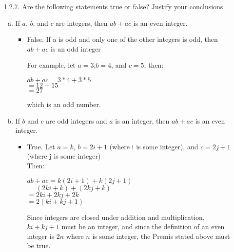 \documentclass[12pt]{article}
\begin{document}
\begin{itemize}
\hrulefill

\item[1.2.7.] Are the following statements true or false? Justify your conclusions.
\begin{enumerate}[(a)]
\item If $a$, $b$, and $c$ are integers, then $ab+ac$ is an even integer.
\begin{itemize}
    \item False. If a is odd and only one of the other integers is odd, then $ab+ac$ is an odd integer
\par For example, let $a=3$,$b=4$, and $c=5$, then:
\begin{center}
    $ab+ac=3*4+3*5$ \\
    $=12+15$ \\
    $=27$
\end{center}
which is an odd number.
\end{itemize}
\item If $b$ and $c$ are odd integers and $a$ is an integer, then $ab+ac$ is an even integer.
\begin{itemize}
    \item True. Let $a=k$, $b=2i+1$ (where i is some integer), and $c=2j+1$ (where j is some integer) \\
    Then:
    \begin{center}
        $ab+ac=k(2i+1)+k(2j+1)$ \\
        $=(2ki+k)+(2kj+k)$ \\
        $=2ki+2kj+2k$ \\
        $=2(ki+kj+1)$ \\
    \end{center}
    \par Since integers are closed under addition and multiplication, $ki+kj+1$ must be an integer, and since the definition of an even integer is $2n$ where $n$ is some integer, the Premis stated above must be true.
\end{itemize}
\end{enumerate}
\end{itemize}
\end{document}
